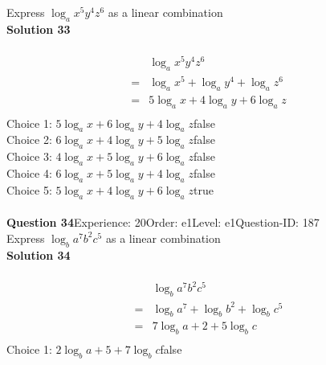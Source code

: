 \documentclass{article}
\begin{document}
Express $\log_{a}x^5y^4z^6$ as a linear combination\\[4pt]
\noindent\textbf{Solution 33}\\[2pt]
\\[-35pt]\begin{align*}
&\log_{a}x^5y^4z^6\\[2pt]
=&\log_{a}x^5+\log_{a}y^4+\log_{a}z^6\\[2pt]
=&5\log_{a}x+4\log_{a}y+6\log_{a}z\\[-30pt]
\end{align*}
Choice 1: \hspace{20pt}$5\log_{a}x+6\log_{a}y+4\log_{a}z$\hspace{20pt}false\\
Choice 2: \hspace{20pt}$6\log_{a}x+4\log_{a}y+5\log_{a}z$\hspace{20pt}false\\
Choice 3: \hspace{20pt}$4\log_{a}x+5\log_{a}y+6\log_{a}z$\hspace{20pt}false\\
Choice 4: \hspace{20pt}$6\log_{a}x+5\log_{a}y+4\log_{a}z$\hspace{20pt}false\\
Choice 5: \hspace{20pt}$5\log_{a}x+4\log_{a}y+6\log_{a}z$\hspace{20pt}true\\
\\[4pt]
\noindent\textbf{Question 34}\hspace{20pt}Experience: 20\hspace{20pt}Order: e1\hspace{20pt}Level: e1\hspace{20pt}Question-ID: 187\\[2pt]
Express $\log_{b}a^7b^2c^5$ as a linear combination\\[4pt]
\noindent\textbf{Solution 34}\\[2pt]
\\[-35pt]\begin{align*}
&\log_{b}a^7b^2c^5\\[2pt]
=&\log_{b}a^7+\log_{b}b^2+\log_{b}c^5\\[2pt]
=&7\log_{b}a+2+5\log_{b}c\\[-30pt]
\end{align*}
Choice 1: \hspace{20pt}$2\log_{b}a+5+7\log_{b}c$\hspace{20pt}false\\
\end{document}
